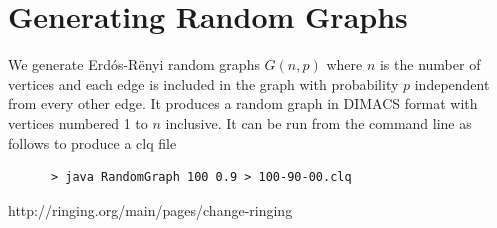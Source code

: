\documentclass{l4proj}
\begin{document}
\begin{appendices}
\begin{tabular}{| p{2.5cm}| l | l | l | l |}
\hline


\end{tabular}

\chapter{Generating Random Graphs}
\label{sec:randomGraph}
We generate Erd\'{o}s-R\"{e}nyi random graphs $G(n,p)$ where $n$ is the number of vertices and
each edge is included in the graph with probability $p$ independent from every other edge. It produces
a random graph in DIMACS format with vertices numbered 1 to $n$ inclusive. It can be run from the command line as follows to produce 
a clq file
\begin{verbatim}
      > java RandomGraph 100 0.9 > 100-90-00.clq
\end{verbatim}
\end{appendices}




http://ringing.org/main/pages/change-ringing
\end{document}
